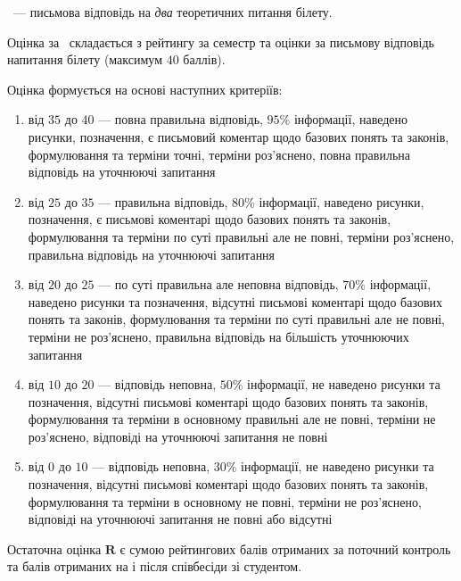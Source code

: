 \documentclass{Syllabus}
\begin{document}

\Control~--- письмова відповідь на \emph{\color{main} два} теоретичних питання білету.

Оцінка за \control\ складається з рейтингу за семестр та оцінки за письмову відповідь напитання білету (максимум $40$ баллів).

Оцінка формується на основі наступних критеріїв:
\begin{enumerate}[label=$\bullet$]
	\item від $35$ до $40$ --- повна правильна відповідь, $95$\% інформації, наведено рисунки, позначення, є письмовий коментар щодо базових понять та законів, формулювання та терміни точні, терміни роз’яснено, повна правильна відповідь на уточнюючі запитання
	\item від $25$ до $35$ --- правильна відповідь, 80\% інформації, наведено рисунки, позначення, є письмові коментарі щодо базових понять та законів, формулювання та терміни по суті правильні але не повні, терміни роз’яснено, правильна відповідь на уточнюючі запитання
	\item від $20$ до $25$ --- по суті правильна але неповна відповідь, $70$\% інформації, наведено рисунки та позначення, відсутні письмові коментарі щодо базових понять та законів, формулювання та терміни по суті правильні але не повні, терміни не роз’яснено, правильна відповідь на більшість уточнюючих запитання
	\item від $10$ до $20$ --- відповідь неповна, $50$\% інформації, не наведено рисунки та позначення, відсутні письмові коментарі щодо базових понять та законів, формулювання та терміни в основному правильні але не повні, терміни не роз’яснено, відповіді на уточнюючі запитання не повні
	\item від $0$ до $10$ --- відповідь неповна, $30$\% інформації, не наведено рисунки та позначення, відсутні письмові коментарі щодо базових понять та законів, формулювання та терміни в основному не повні, терміни не роз’яснено, відповіді на уточнюючі запитання не повні або відсутні
\end{enumerate}


Остаточна оцінка $\mathbf{R}$ є сумою рейтингових балів отриманих за поточний контроль та балів отриманих на \control і після співбесіди зі студентом.
\end{document}
